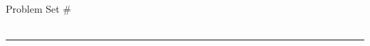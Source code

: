 \documentclass[11pt]{article}
\newcounter{problem}
\begin{document}
\begin{center}
  {\Large \textbf{\coursename}}\\[4pt]
  {\large Problem Set \#\psetnumber}\\[2pt]
  {\duedate}\\[2pt]
  {\instructor}
\end{center}
\hrule
\vspace{8pt}


\end{document}
